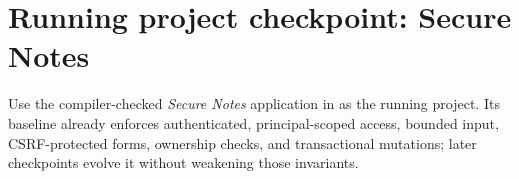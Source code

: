 \section{Running project checkpoint: Secure Notes}
Use the compiler-checked \emph{Secure Notes} application in  as the running project. Its baseline already enforces authenticated, principal-scoped access, bounded input, CSRF-protected forms, ownership checks, and transactional mutations; later checkpoints evolve it without weakening those invariants.
